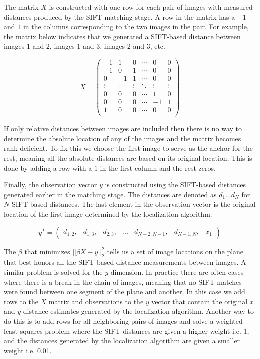 \documentclass[runningheads]{llncs}
\begin{document}
The matrix $X$ is constructed with one row for each pair of images with measured distances produced by the SIFT matching stage. A row in the matrix has a $-1$ and $1$ in the columns corresponding to the two images in the pair. For example, the matrix below indicates that we generated a SIFT-based distance between images 1 and 2, images 1 and 3, images 2 and 3, etc. 

\[
 X =
 \begin{pmatrix}
  -1 & 1 & 0 & \cdots & 0 & 0\\
  -1 & 0 & 1 & \cdots & 0 & 0\\
   0 & -1 & 1 & \cdots & 0 & 0\\
  \vdots  & \vdots & \vdots & \ddots & \vdots  & \vdots\\
  0 & 0 & 0 & \cdots & 1 & 0 \\ 
  0 & 0 & 0 & \cdots & -1 & 1 \\ 
  1 & 0 & 0 & \cdots & 0 & 0 \\ 
 \end{pmatrix}
\]

If only relative distances between images are included then there is no way to determine the absolute location of any of the images and the matrix becomes rank deficient. To fix this we choose the first image to serve as the anchor for the rest, meaning all the absolute distances are based on its original location. This is done by adding a row with a $1$ in the first column and the rest zeros. 

Finally, the observation vector $y$ is constructed using the SIFT-based distances generated earlier in the matching stage. The distances are denoted as $d_1 \dots d_N$ for $N$ SIFT-based distances. The last element in the observation vector is the original location of the first image determined by the localization algorithm. 

\[
y^T = 
 \begin{pmatrix}
  d_{1,2}, & d_{1,3}, & d_{2,3}, & \hdots & d_{N-2,N-1}, & d_{N-1,N}, &  x_1
 \end{pmatrix}
\]

The $\beta$ that minimizes  $||\beta X - y||_2^2$ tells us a set of image locations on the plane that best honors all the SIFT-based distance measurements between images. A similar problem is solved for the $y$ dimension. In practice there are often cases where there is a break in the chain of images, meaning that no SIFT matches were found between one segment of the plane and another. In this case we add rows to the $X$ matrix and observations to the $y$ vector that contain the original $x$ and $y$ distance estimates generated by the localization algorithm. Another way to do this is to add rows for all neighboring pairs of images and solve a weighted least squares problem where the SIFT distances are given a higher weight i.e. 1, and the distances generated by the localization algorithm are given a smaller weight i.e. 0.01. 
\end{document}
